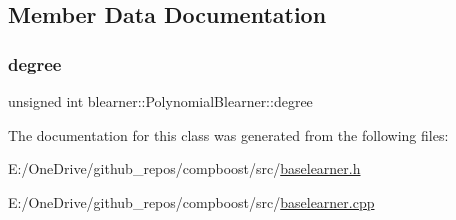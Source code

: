 \subsection{Member Data Documentation}
\mbox{\label{classblearner_1_1_polynomial_blearner_a7a522e19634367a4bfad2d6ea532ec44}} 
\subsubsection{\texorpdfstring{degree}{degree}}
{\footnotesize\ttfamily unsigned int blearner\+::\+Polynomial\+Blearner\+::degree\hspace{0.3cm}{\ttfamily [private]}}



The documentation for this class was generated from the following files\+:\begin{DoxyCompactItemize}
\item 
E\+:/\+One\+Drive/github\+\_\+repos/compboost/src/\mbox{\hyperlink{baselearner_8h}{baselearner.\+h}}\item 
E\+:/\+One\+Drive/github\+\_\+repos/compboost/src/\mbox{\hyperlink{baselearner_8cpp}{baselearner.\+cpp}}\end{DoxyCompactItemize}
